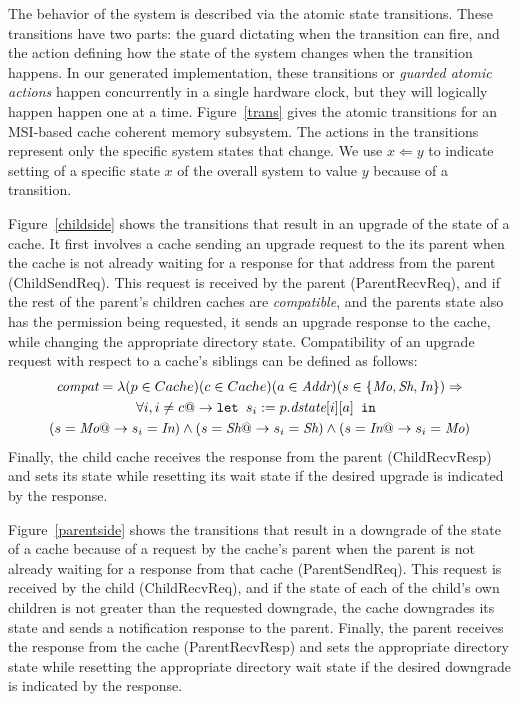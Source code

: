 The behavior of the system is described via the atomic state
transitions. These transitions have two parts: the guard dictating
when the transition can fire, and the action defining how the state of
the system changes when the transition happens. In our generated
implementation, these transitions or \emph{guarded atomic actions}
happen concurrently in a single hardware clock, but they will
logically happen happen one at a time. Figure~\ref{trans} gives the
atomic transitions for an MSI-based cache coherent memory subsystem. The actions
in the transitions represent only the specific system states that
change. We use $x \Leftarrow y$ to indicate setting of a specific
state $x$ of the overall system to value $y$ because of a transition.

Figure~\ref{childside} shows the transitions that result in an upgrade of the
state of a cache. It first involves a cache sending an upgrade request to the
its parent when the cache is not already waiting for a response for that
address from the parent (ChildSendReq). This request is received by the parent
(ParentRecvReq), and if the rest of the parent's children caches are
\emph{compatible}, and the parents state also has the permission being
requested, it sends an upgrade response to the cache, while changing the
appropriate directory state. Compatibility of an upgrade request with respect
to a cache's siblings can be defined as follows:
\begin{multline*}
\textit{compat} = \lambda (p \in Cache) (c \in Cache) (a \in \textit{Addr}) (s \in
\{\textit{Mo}, \textit{Sh}, \textit{In}\}) \Rightarrow\\ \forall i, i \ne c @->
\texttt{let } s_i := p.\textit{dstate}[i][a] \texttt{ in }\\
 (s = \textit{Mo} @-> s_i = \textit{In}) \wedge (s = \textit{Sh} @-> s_i = \textit{Sh}) \wedge (s = \textit{In} @-> s_i = \textit{Mo})
\end{multline*}
Finally, the child cache receives the response from the parent (ChildRecvResp)
and sets its state while resetting its wait state if the desired upgrade is
indicated by the response.

Figure~\ref{parentside} shows the transitions that result in a downgrade of the
state of a cache because of a request by the cache's parent when the parent is
not already waiting for a response from that cache (ParentSendReq).  This
request is received by the child (ChildRecvReq), and if the state of each of
the child's own children is not greater than the requested downgrade, the cache
downgrades its state and sends a notification response to the parent. Finally,
the parent receives the response from the cache (ParentRecvResp) and sets the
appropriate directory state while resetting the appropriate directory wait state
if the desired downgrade is indicated by the response.

